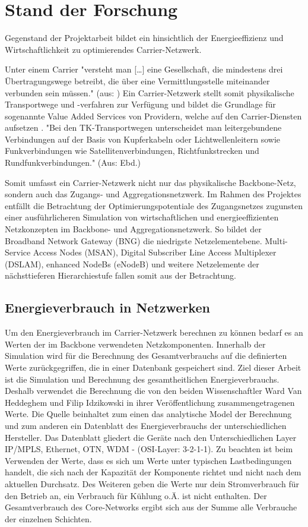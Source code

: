 \documentclass[12pt,titlepage]{article}
\newcommand{\firstpages}{

     \newpage
     \tableofcontents{}
     \addtocontents{toc}{~\hfill\textbf{Seite}\par}

     \newpage
     \listoffigures

     \newpage
     \listoftables
     \newpage
}
\begin{document}
\firstpages
\section{Stand der Forschung}
Gegenstand der Projektarbeit bildet ein hinsichtlich der Energieeffizienz und Wirtschaftlichkeit zu optimierendes Carrier-Netzwerk.

Unter einem Carrier "versteht man […] eine Gesellschaft, die mindestens drei Übertra\-gungs\-wege betreibt, die über eine Vermittlungsstelle miteinander verbunden sein müssen." (aus: \cite{carrier}) Ein Carrier-Netzwerk stellt somit physikalische Transportwege und -verfahren zur Verfügung und bildet die Grundlage für sogenannte Value Added Services von Providern, welche auf den Carrier-Diensten aufsetzen \cite{fassnacht}. "Bei den TK-Transportwegen unterscheidet man leitergebundene Verbindungen auf der Basis von Kupferkabeln oder Lichtwellenleitern sowie Funkverbindungen wie Satellitenverbindungen, Richtfunkstrecken und Rundfunkverbindungen." (Aus: Ebd.)

Somit umfasst ein Carrier-Netzwerk nicht nur das physikalische Backbone-Netz, sondern auch das Zugangs- und Aggregationsnetzwerk. Im Rahmen des Projektes entfällt die Betrachtung der Optimierungspotentiale des Zugangsnetzes zugunsten einer aus\-führ\-lich\-eren Simulation von wirtschaftlichen und energieeffizienten Netzkonzepten im Backbone- und Aggregationsnetzwerk. So bildet der Broadband Network Gateway (BNG) die niedrigste Netzelementebene. Multi-Service Access Nodes (MSAN), Digital Subscriber Line Access Multiplexer (DSLAM), enhanced NodeBs (eNodeB) und weitere Netzelemente der nächsttieferen Hierarchiestufe fallen somit aus der Betrachtung.


\subsection{Energieverbrauch in Netzwerken}
Um den Energieverbrauch im Carrier-Netzwerk berechnen zu können bedarf es an Werten der im Backbone verwendeten Netzkomponenten. Innerhalb der Simulation wird für die Berechnung des Gesamtverbrauchs auf die definierten Werte zurückgegriffen, die in einer Datenbank gespeichert sind. Ziel dieser Arbeit ist die Simulation und Berechnung des gesamtheitlichen Energieverbrauchs. Deshalb verwendet die Berechnung die von den beiden Wissenschaftler Ward Van Heddeghem und Filip Idzikowski in ihrer Veröffentlichung zusammengetragenen Werte. Die Quelle beinhaltet zum einen das analytische Model der Berechnung und zum anderen ein Datenblatt des Energieverbrauchs der unterschiedlichen Hersteller. Das Datenblatt gliedert die Geräte nach den Unterschiedlichen Layer IP/MPLS, Ethernet, OTN, WDM - (OSI-Layer: 3-2-1-1). Zu beachten ist beim Verwenden der Werte, dass es sich um Werte unter typischen Lastbedingungen handelt, die sich nach der Kapazität der Komponente richtet und nicht nach dem aktuellen Durchsatz. Des Weiteren geben die Werte nur dein Stromverbrauch für den Betrieb an, ein Verbrauch für Kühlung o.Ä. ist nicht enthalten.
Der Gesamtverbrauch des Core-Networks ergibt sich aus der Summe alle Verbrauche der einzelnen Schichten. 
\end{document}

